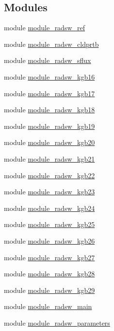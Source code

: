 \subsection*{Modules}
\begin{DoxyCompactItemize}
\item 
module \hyperlink{namespacemodule__radsw__ref}{module\+\_\+radsw\+\_\+ref}
\item 
module \hyperlink{namespacemodule__radsw__cldprtb}{module\+\_\+radsw\+\_\+cldprtb}
\item 
module \hyperlink{namespacemodule__radsw__sflux}{module\+\_\+radsw\+\_\+sflux}
\item 
module \hyperlink{namespacemodule__radsw__kgb16}{module\+\_\+radsw\+\_\+kgb16}
\item 
module \hyperlink{namespacemodule__radsw__kgb17}{module\+\_\+radsw\+\_\+kgb17}
\item 
module \hyperlink{namespacemodule__radsw__kgb18}{module\+\_\+radsw\+\_\+kgb18}
\item 
module \hyperlink{namespacemodule__radsw__kgb19}{module\+\_\+radsw\+\_\+kgb19}
\item 
module \hyperlink{namespacemodule__radsw__kgb20}{module\+\_\+radsw\+\_\+kgb20}
\item 
module \hyperlink{namespacemodule__radsw__kgb21}{module\+\_\+radsw\+\_\+kgb21}
\item 
module \hyperlink{namespacemodule__radsw__kgb22}{module\+\_\+radsw\+\_\+kgb22}
\item 
module \hyperlink{namespacemodule__radsw__kgb23}{module\+\_\+radsw\+\_\+kgb23}
\item 
module \hyperlink{namespacemodule__radsw__kgb24}{module\+\_\+radsw\+\_\+kgb24}
\item 
module \hyperlink{namespacemodule__radsw__kgb25}{module\+\_\+radsw\+\_\+kgb25}
\item 
module \hyperlink{namespacemodule__radsw__kgb26}{module\+\_\+radsw\+\_\+kgb26}
\item 
module \hyperlink{namespacemodule__radsw__kgb27}{module\+\_\+radsw\+\_\+kgb27}
\item 
module \hyperlink{namespacemodule__radsw__kgb28}{module\+\_\+radsw\+\_\+kgb28}
\item 
module \hyperlink{namespacemodule__radsw__kgb29}{module\+\_\+radsw\+\_\+kgb29}
\item 
module \hyperlink{namespacemodule__radsw__main}{module\+\_\+radsw\+\_\+main}
\item 
module \hyperlink{namespacemodule__radsw__parameters}{module\+\_\+radsw\+\_\+parameters}
\end{DoxyCompactItemize}
